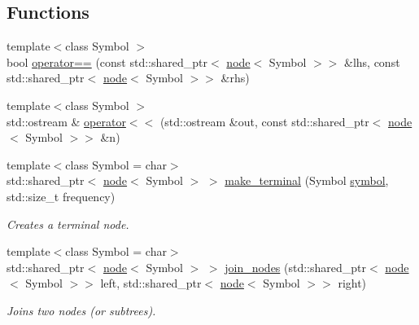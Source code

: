 \subsection*{Functions}
\begin{DoxyCompactItemize}
\item 
{\footnotesize template$<$class Symbol $>$ }\\bool \mbox{\hyperlink{namespaceirk_1_1coding_1_1huffman_a63e61bc94c39b2400e4cf422db2ececf}{operator==}} (const std\+::shared\+\_\+ptr$<$ \mbox{\hyperlink{structirk_1_1coding_1_1huffman_1_1node}{node}}$<$ Symbol $>$$>$ \&lhs, const std\+::shared\+\_\+ptr$<$ \mbox{\hyperlink{structirk_1_1coding_1_1huffman_1_1node}{node}}$<$ Symbol $>$$>$ \&rhs)
\item 
{\footnotesize template$<$class Symbol $>$ }\\std\+::ostream \& \mbox{\hyperlink{namespaceirk_1_1coding_1_1huffman_a84ac96d5053bc449a2a6b1b8a66aa9da}{operator$<$$<$}} (std\+::ostream \&out, const std\+::shared\+\_\+ptr$<$ \mbox{\hyperlink{structirk_1_1coding_1_1huffman_1_1node}{node}}$<$ Symbol $>$$>$ \&n)
\item 
{\footnotesize template$<$class Symbol  = char$>$ }\\std\+::shared\+\_\+ptr$<$ \mbox{\hyperlink{structirk_1_1coding_1_1huffman_1_1node}{node}}$<$ Symbol $>$ $>$ \mbox{\hyperlink{namespaceirk_1_1coding_1_1huffman_a02736685ec8f32576af06336b2ec9ed8}{make\+\_\+terminal}} (Symbol \mbox{\hyperlink{porter2_8hpp_a04438e24473719aaf288c57833717164}{symbol}}, std\+::size\+\_\+t frequency)
\begin{DoxyCompactList}\small\item\em Creates a terminal node. \end{DoxyCompactList}\item 
{\footnotesize template$<$class Symbol  = char$>$ }\\std\+::shared\+\_\+ptr$<$ \mbox{\hyperlink{structirk_1_1coding_1_1huffman_1_1node}{node}}$<$ Symbol $>$ $>$ \mbox{\hyperlink{namespaceirk_1_1coding_1_1huffman_ac5ed25bf8ec1c076d2905f59e3930502}{join\+\_\+nodes}} (std\+::shared\+\_\+ptr$<$ \mbox{\hyperlink{structirk_1_1coding_1_1huffman_1_1node}{node}}$<$ Symbol $>$$>$ left, std\+::shared\+\_\+ptr$<$ \mbox{\hyperlink{structirk_1_1coding_1_1huffman_1_1node}{node}}$<$ Symbol $>$$>$ right)
\begin{DoxyCompactList}\small\item\em Joins two nodes (or subtrees). \end{DoxyCompactList}\item 
$$
\end{DoxyCompactItemize}
